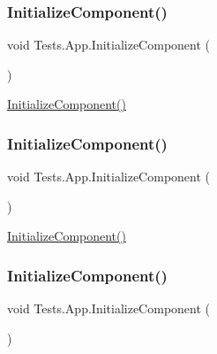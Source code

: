 \subsubsection{\texorpdfstring{Initialize\+Component()}{InitializeComponent()}\hspace{0.1cm}{\footnotesize\ttfamily [3/6]}}
{\footnotesize\ttfamily void Tests.\+App.\+Initialize\+Component (\begin{DoxyParamCaption}{ }\end{DoxyParamCaption})}



\hyperlink{class_tests_1_1_app_a875bfeeb11fe6c3334e474fd5fc1ea20}{Initialize\+Component()} 

\mbox{\label{class_tests_1_1_app_a875bfeeb11fe6c3334e474fd5fc1ea20}} 
\subsubsection{\texorpdfstring{Initialize\+Component()}{InitializeComponent()}\hspace{0.1cm}{\footnotesize\ttfamily [4/6]}}
{\footnotesize\ttfamily void Tests.\+App.\+Initialize\+Component (\begin{DoxyParamCaption}{ }\end{DoxyParamCaption})}



\hyperlink{class_tests_1_1_app_a875bfeeb11fe6c3334e474fd5fc1ea20}{Initialize\+Component()} 

\mbox{\label{class_tests_1_1_app_a875bfeeb11fe6c3334e474fd5fc1ea20}} 
\subsubsection{\texorpdfstring{Initialize\+Component()}{InitializeComponent()}\hspace{0.1cm}{\footnotesize\ttfamily [5/6]}}
{\footnotesize\ttfamily void Tests.\+App.\+Initialize\+Component (\begin{DoxyParamCaption}{ }\end{DoxyParamCaption})}



